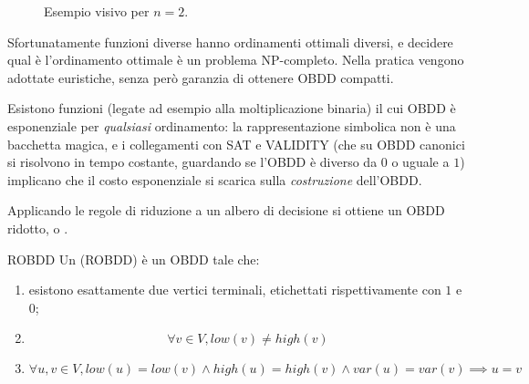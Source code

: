 \begin{example}{}
\begin{figure}[H]
\begin{minipage}{0.5\textwidth}
          \caption*{Ordine \(x_1, x_2, y_1, y_2\) (Dim: 11)}
      \end{minipage}
      \vspace{0.3cm}
      \caption*{Esempio visivo per \(n=2\).}
  \end{figure}
\end{example}

Sfortunatamente funzioni diverse hanno ordinamenti ottimali diversi, e decidere qual è l'ordinamento ottimale è un problema NP-completo. Nella pratica vengono adottate euristiche, senza però garanzia di ottenere OBDD compatti.

\begin{warning}{}
  Esistono funzioni (legate ad esempio alla moltiplicazione binaria) il cui OBDD è esponenziale per \emph{qualsiasi} ordinamento: la rappresentazione simbolica non è una bacchetta magica, e i collegamenti con SAT e VALIDITY (che su OBDD canonici si risolvono in tempo costante, guardando se l'OBDD è diverso da \(0\) o uguale a \(1\)) implicano che il costo esponenziale si scarica sulla \emph{costruzione} dell'OBDD.
\end{warning}

Applicando le regole di riduzione a un albero di decisione si ottiene un OBDD ridotto, o .

\begin{definition}{ROBDD}
  Un  (ROBDD) è un OBDD tale che:
  \begin{enumerate}
    \item esistono esattamente due vertici terminali, etichettati rispettivamente con \(1\) e \(0\);
    \item \[\forall v \in V, low(v)\neq high(v)\]
    \item \[\forall u,v \in V, low(u) = low(v) \land high(u) = high(v) \land var(u) = var(v) \implies u = v\]
  \end{enumerate}
\end{definition}

